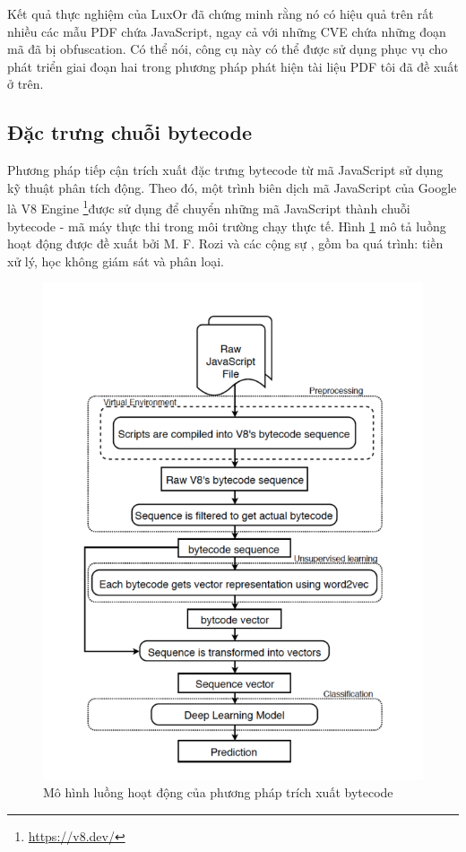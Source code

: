 \documentclass[./../main.tex]{subfiles}
\begin{document}
Kết quả thực nghiệm của LuxOr đã chứng minh rằng nó có hiệu quả trên rất nhiều các mẫu PDF chứa JavaScript, ngay cả với những CVE chứa những đoạn mã đã bị obfuscation. Có thể nói, công cụ này có thể được sử dụng phục vụ cho phát triển giai đoạn hai trong phương pháp phát hiện tài liệu PDF tôi đã đề xuất ở trên.

\subsection*{Đặc trưng chuỗi bytecode}
Phương pháp tiếp cận trích xuất đặc trưng bytecode từ mã JavaScript sử dụng kỹ thuật phân tích động. Theo đó, một trình biên dịch mã JavaScript của Google là V8 Engine \footnote{\url{https://v8.dev/}}được sử dụng để chuyển những mã JavaScript thành chuỗi bytecode - mã máy thực thi trong môi trường chạy thực tế. Hình \ref{fig:bytecode_flow} mô tả luồng hoạt động được đề xuất bởi M. F. Rozi và các cộng sự \cite{bytecode}, gồm ba quá trình: tiền xử lý, học không giám sát và phân loại.


\begin{figure}[H]
	\centering
	\includegraphics[width=\linewidth]{./images/bytecode_flow.png}
	\caption{Mô hình luồng hoạt động của phương pháp trích xuất bytecode \cite{bytecode}}
	\label{fig:bytecode_flow}
\end{figure}
\end{document}
